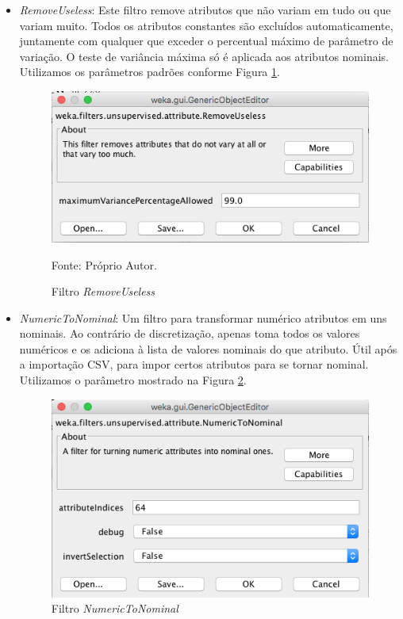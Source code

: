 \documentclass[
	12pt,				%
	openright,			%
	oneside,	
	a4paper,				%
	english,				%
	brazil				%
]{abntex2/abntex2} %
\begin{document}
		\begin{itemize}
			\item \textit{RemoveUseless}: Este filtro remove atributos que não variam em tudo ou que variam muito. Todos os atributos constantes são excluídos automaticamente, juntamente com qualquer que exceder o percentual máximo de parâmetro de variação. O teste de variância máxima só é aplicada aos atributos nominais. Utilizamos os parâmetros padrões conforme Figura \ref{figfiltroRemoveUseless}.
			\begin{figure}[!h]
				\caption{\label{figfiltroRemoveUseless} Filtro \textit{RemoveUseless}}
				\begin{center}
					\includegraphics[scale=0.45]{img/filtroRemoveUseless.png}
				\end{center}
				\centering Fonte: Próprio Autor.
			\end{figure}
			\item \textit{NumericToNominal}: Um filtro para transformar numérico atributos em uns nominais. Ao contrário de discretização, apenas toma todos os valores numéricos e os adiciona à lista de valores nominais do que atributo. Útil após a importação CSV, para impor certos atributos para se tornar nominal. Utilizamos o parâmetro mostrado na Figura \ref{figfiltroNumericToNominal}.
			\begin{figure}[!h]
				\caption{\label{figfiltroNumericToNominal} Filtro \textit{NumericToNominal}}
				\begin{center}
					\includegraphics[scale=0.45]{img/filtroNumericToNominal.png}

\end{center}
\end{figure}
\end{itemize}
\end{document}
